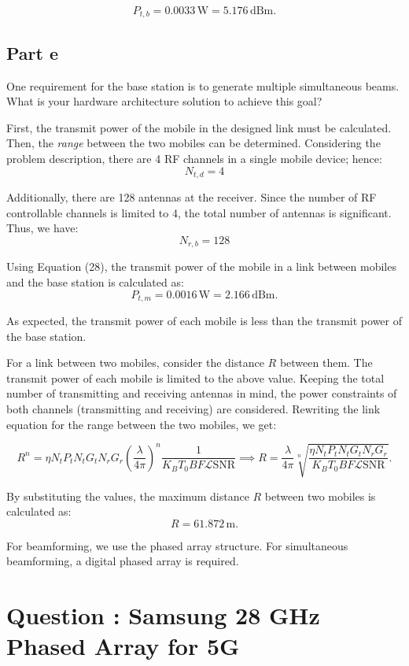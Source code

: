 \documentclass[12pt,onecolumn,a4paper]{article}
\newcommand\question[1][\space]{
	\section[Question \numberstringnum{\thesection}]
	{Question \numberstringnum{\thesection}: #1}
}
\begin{document}
\[
P_{t,b} = 0.0033 \, \text{W} = 5.176 \, \text{dBm}.
\]


\subsection{Part e}
{\color{questioncolor}
One requirement for the base station is to generate multiple simultaneous beams. What is your hardware architecture solution to achieve this goal?\\
}


	
	First, the transmit power of the mobile in the designed link must be calculated. Then, the \textit{range} between the two mobiles can be determined. Considering the problem description, there are 4 RF channels in a single mobile device; hence:
	\[
	N_{t,d} = 4
	\]
	
	Additionally, there are 128 antennas at the receiver. Since the number of RF controllable channels is limited to 4, the total number of antennas is significant. Thus, we have:
	\[
	N_{r,b} = 128
	\]
	
	Using Equation (28), the transmit power of the mobile in a link between mobiles and the base station is calculated as:
	\[
	P_{t,m} = 0.0016 \, \text{W} = 2.166 \, \text{dBm}.
	\]
	
	As expected, the transmit power of each mobile is less than the transmit power of the base station.
	
	For a link between two mobiles, consider the distance \(R\) between them. The transmit power of each mobile is limited to the above value. Keeping the total number of transmitting and receiving antennas in mind, the power constraints of both channels (transmitting and receiving) are considered. Rewriting the link equation for the range between the two mobiles, we get:
	
	\[
	R^n = \eta N_t P_t N_t G_t N_r G_r \left( \frac{\lambda}{4\pi} \right)^n \frac{1}{K_B T_0 B F \mathcal{L} \text{SNR}} \implies R = \frac{\lambda}{4\pi} \sqrt[n]{\frac{\eta N_t P_t N_t G_t N_r G_r}{K_B T_0 B F \mathcal{L} \text{SNR}}}.
	\]
	
	By substituting the values, the maximum distance \(R\) between two mobiles is calculated as:
	\[
	R = 61.872 \, \text{m}.
	\]
	
	
	For beamforming, we use the phased array structure. For simultaneous beamforming, a digital phased array is required.
	


\FloatBarrier\question[Samsung 28 GHz Phased Array for 5G]
\end{document}
